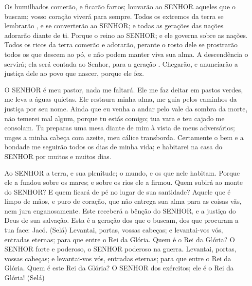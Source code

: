 {  Os humilhados comerão, e ficarão fartos; louvarão ao SENHOR aqueles que o buscam; vosso coração viverá para sempre.
  Todos os extremos da terra se lembrarão
{},  e se converterão ao SENHOR; e todas as gerações das nações adorarão diante de ti.
  Porque o reino
{} ao SENHOR; e ele governa sobre as nações.
  Todos os ricos da terra comerão e adorarão,
{} perante o rosto dele se prostrarão todos os que descem ao pó, e
{} não podem manter viva sua alma.
  A descendência o servirá; ela será contada ao Senhor, para a geração
{} .
  Chegarão, e anunciarão a justiça dele ao povo que nascer, porque ele
{} fez.
\par }


{\PP 
  O SENHOR é meu pastor, nada me faltará.
  Ele me faz deitar em pastos verdes,
{} me leva a águas quietas.
  Ele restaura minha alma,
{} me guia pelos caminhos da justiça por seu nome.
  Ainda que eu venha a andar pelo vale da sombra da morte, não temerei mal algum, porque tu estás comigo; tua vara e teu cajado me consolam.
  Tu preparas uma mesa diante de mim à vista de meus adversários; unges a minha cabeça com azeite, meu cálice transborda.
  Certamente o bem e a bondade me seguirão todos os dias de minha vida; e habitarei na casa do SENHOR por muitos e muitos dias.
\par }


{\PP 
  Ao SENHOR
{} a terra, e sua plenitude; o mundo, e os que nele habitam.
  Porque ele a fundou sobre os mares; e sobre os rios ele a firmou.
  Quem subirá ao monte do SENHOR? E quem ficará de pé no lugar de sua santidade?
  Aquele que é limpo de mãos, e puro de coração, que não entrega sua alma para as coisas vãs, nem jura enganosamente.
  Este receberá a bênção do SENHOR, e a justiça do Deus de sua salvação.
  Esta é a geração dos que o buscam, dos que procuram a tua face:
{} Jacó. (Selá)
  Levantai, portas, vossas cabeças; e levantai-vos vós, entradas eternas; para que entre o Rei da Glória.
  Quem é o Rei da Glória? O SENHOR forte e poderoso, o SENHOR poderoso na guerra.
  Levantai, portas, vossas cabeças; e levantai-vos vós, entradas eternas; para que entre o Rei da Glória.
  Quem é este Rei da Glória? O SENHOR dos exércitos; ele é o Rei da Glória! (Selá)
\par }

